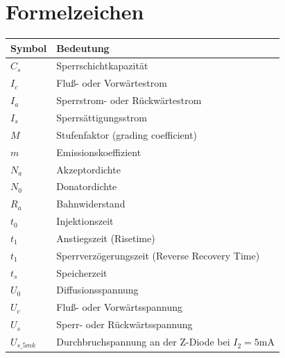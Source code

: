 \documentclass[
	a4paper, %
	12pt, %
]{CSUniSchoolLabReport}
\begin{document}
\section{Formelzeichen}
\begin{table}[H]
\centering
\begin{tabular}{ll}
\toprule
\textbf{Symbol} & \textbf{Bedeutung} \\
\midrule
$C_s$    & Sperrschichtkapazität \\
$I_c$    & Fluß- oder Vorwärtestrom \\
$I_a$    & Sperrstrom- oder Rückwärtestrom \\
$I_s$    & Sperrsättigungsstrom \\
$M$      & Stufenfaktor (grading coefficient) \\
$m$      & Emissionskoeffizient \\
$N_a$    & Akzeptordichte \\
$N_0$    & Donatordichte \\
$R_a$    & Bahnwiderstand \\
$t_0$    & Injektionszeit \\
$t_1$    & Anstiegszeit (Risetime) \\
$t_1$    & Sperrverzögerungszeit (Reverse Recovery Time) \\
$t_s$    & Speicherzeit \\
$U_0$    & Diffusionsspannung \\
$U_c$    & Fluß- oder Vorwärtsspannung \\
$U_s$    & Sperr- oder Rückwärtsspannung \\
$U_{s\_5mk}$ & Durchbruchspannung an der Z-Diode bei $I_2 = 5$mA \\
\bottomrule
\end{tabular}
\end{table}



\end{document}
